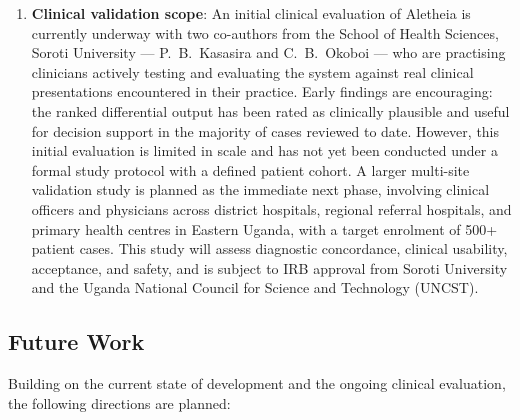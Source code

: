\documentclass[conference]{IEEEtran}
\begin{document}
\begin{enumerate}
  \item \textbf{Clinical validation scope}: An initial clinical
        evaluation of Aletheia is currently underway with two
        co-authors from the School of Health Sciences, Soroti
        University --- P.~B.~Kasasira and C.~B.~Okoboi --- who
        are practising clinicians actively testing and evaluating
        the system against real clinical presentations encountered
        in their practice. Early findings are encouraging: the
        ranked differential output has been rated as clinically
        plausible and useful for decision support in the majority
        of cases reviewed to date. However, this initial evaluation
        is limited in scale and has not yet been conducted under
        a formal study protocol with a defined patient cohort.
        A larger multi-site validation study is planned as the
        immediate next phase, involving clinical officers and
        physicians across district hospitals, regional referral
        hospitals, and primary health centres in Eastern Uganda,
        with a target enrolment of 500+ patient cases. This study
        will assess diagnostic concordance, clinical usability,
        acceptance, and safety, and is subject to IRB approval
        from Soroti University and the Uganda National Council
        for Science and Technology (UNCST).
\end{enumerate}

\subsection{Future Work}

Building on the current state of development and the ongoing
clinical evaluation, the following directions are planned:
\end{document}
